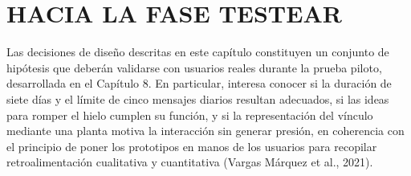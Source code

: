
\section{HACIA LA FASE TESTEAR}
Las decisiones de diseño descritas en este capítulo constituyen un conjunto de hipótesis que deberán validarse con usuarios reales durante la prueba piloto, desarrollada en el Capítulo 8. En particular, interesa conocer si la duración de siete días y el límite de cinco mensajes diarios resultan adecuados, si las ideas para romper el hielo cumplen su función, y si la representación del vínculo mediante una planta motiva la interacción sin generar presión, en coherencia con el principio de poner los prototipos en manos de los usuarios para recopilar retroalimentación cualitativa y cuantitativa (Vargas Márquez et al., 2021).